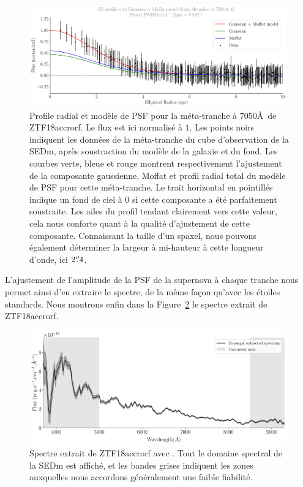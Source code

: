\documentclass[../main/main.tex]{subfiles}
\begin{document}
\begin{figure}
  \centering
  \includegraphics[width=0.99\textwidth]{../figures/07_scene/output_sn_profile_ZTF18accrorf.pdf}
  \caption[Profile radial et modèle de PSF pour une méta-tranche de
  ZTF18accrorf.]{Profile radial et modèle de PSF pour la méta-tranche à
    $7050$\AA\ de ZTF18accrorf. Le flux est ici normalisé à $1$. Les
    points noirs indiquent les données de la méta-tranche du cube
    d'observation de la SEDm, après soustraction du modèle de la galaxie
  et du fond. Les courbes verte, bleue et rouge montrent respectivement
  l'ajustement de la composante gaussienne, Moffat et profil radial
  total du modèle de PSF pour cette méta-tranche. Le trait horizontal en
pointillés indique un fond de ciel à $0$ si cette composante a été
parfaitement soustraite. Les ailes du profil tendant clairement vers
cette valeur, cela nous conforte quant à la qualité d'ajustement de
cette composante. Connaissant la taille d'un spaxel, nous pouvons
également déterminer la largeur à mi-hauteur à cette longueur d'onde, ici
$2\overset{\prime\prime}{.}4$.}
  \label{fig:radialprofileZTF18accrorf}
\end{figure}

L'ajustement de l'amplitude de la PSF de la supernova à chaque tranche
nous permet ainsi d'en extraire le spectre, de la même façon qu'avec les
étoiles standards. Nous montrons enfin dans la
Figure~\ref{fig:spectraZTF18accrorf} le spectre extrait de ZTF18accrorf.

\begin{figure}
  \centering
  \includegraphics[width=0.99\textwidth]{../figures/07_scene/output_sn_spectra_ZTF18accrorf.pdf}
  \caption[Spectre extrait de ZTF18accrorf avec \hypergal.]{Spectre
    extrait de ZTF18accrorf avec \hypergal. Tout le domaine spectral de
    la SEDm est affiché, et les bandes grises indiquent les zones
    auxquelles nous accordons généralement une faible fiabilité.}
  \label{fig:spectraZTF18accrorf}
\end{figure}
\end{document}
